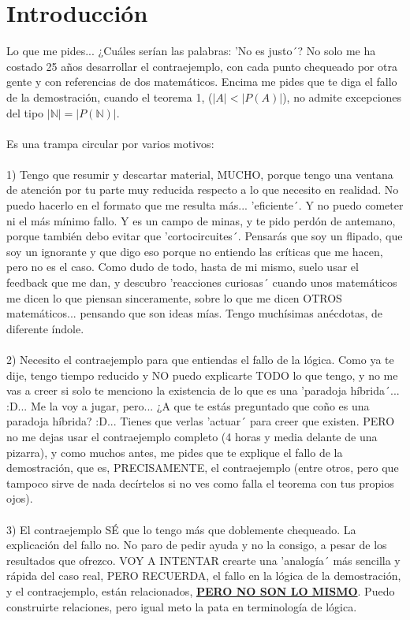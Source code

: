 \chapter{Introducción}
	\noindent
	Lo que me pides... ¿Cuáles serían las palabras: 'No es justo´? No solo me ha costado 25 años desarrollar el contraejemplo, con cada punto chequeado por otra gente y con referencias de dos matemáticos. Encima me pides que te diga el fallo de la demostración, cuando el teorema 1, ($|A| < |P(A)|$), no admite excepciones del tipo $ |\mathbb{N}| = |P(\mathbb{N})| $.\\\\
	
	\noindent
	Es una trampa circular por varios motivos:\\\\
	1) Tengo que resumir y descartar material, MUCHO, porque tengo una ventana de atención por tu parte muy reducida respecto a lo que necesito en realidad. No puedo hacerlo en el formato que me resulta más... 'eficiente´. Y no puedo cometer ni el más mínimo fallo. Y es un campo de minas, y te pido perdón de antemano, porque también debo evitar que 'cortocircuites´. Pensarás que soy un flipado, que soy un ignorante y que digo eso porque no entiendo las críticas que me hacen, pero no es el caso. Como dudo de todo, hasta de mi mismo, suelo usar el feedback que me dan, y descubro 'reacciones curiosas´ cuando unos matemáticos me dicen lo que piensan sinceramente, sobre lo que me dicen OTROS matemáticos... pensando que son ideas mías. Tengo muchísimas anécdotas, de diferente índole.\\\\
	2) Necesito el contraejemplo para que entiendas el fallo de la lógica. Como ya te dije, tengo tiempo reducido y NO puedo explicarte TODO lo que tengo, y no me vas a creer si solo te menciono la existencia de lo que es una 'paradoja híbrida´... :D... Me la voy a jugar, pero... ¿A que te estás preguntado que coño es una paradoja híbrida? :D... Tienes que verlas 'actuar´ para creer que existen. PERO no me dejas usar el contraejemplo completo (4 horas y media delante de una pizarra), y como muchos antes, me pides que te explique el fallo de la demostración, que es, PRECISAMENTE, el contraejemplo (entre otros, pero que tampoco sirve de nada decírtelos si no ves como falla el teorema con tus propios ojos).\\\\
	3) El contraejemplo SÉ que lo tengo más que doblemente chequeado. La explicación del fallo no. No paro de pedir ayuda y no la consigo, a pesar de los resultados que ofrezco. VOY A INTENTAR crearte una 'analogía´ más sencilla y rápida del caso real, PERO RECUERDA, el fallo en la lógica de la demostración, y el contraejemplo, están relacionados, \textbf{\underline{PERO NO SON LO MISMO}}. Puedo construirte relaciones, pero igual meto la pata en terminología de lógica.\\\\
	
